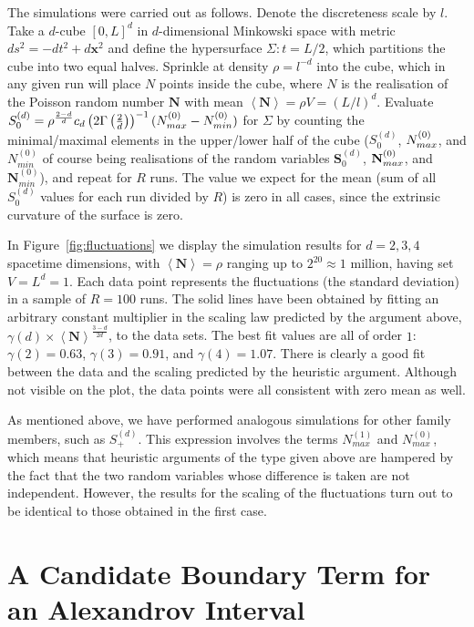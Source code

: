 \documentclass[12pt]{article}
\begin{document}
 
The simulations were carried out as follows. Denote the discreteness scale by $l$. Take a $d$-cube $[0,L]^d$ in $d$-dimensional Minkowski space with metric $ds^2=-dt^2+d{\mathbf x}^2$ and define the hypersurface $\Sigma: t=L/2$, which partitions the cube into two equal halves. Sprinkle at density $\rho=l^{-d}$ into the cube, which in any given run will place $N$ points inside the cube, where $N$ is the realisation of the Poisson random number $\textbf{N}$ with mean $\left\langle \textbf{N}\right\rangle = \rho V=  (L/l)^d$. Evaluate $S^{ (d)}_0=\rho^\frac{2-d}{d}c_d\left (2\Gamma\left (\frac{2}{d}\right)\right)^{-1} (N^{ (0)}_{\vphantom{i}max} - N_{min}^{ (0)})$ for $\Sigma$ by counting the minimal/maximal elements in the upper/lower half of the cube ($S^{ (d)}_0$, $N^{ (0)}_{\vphantom{i}max}$, and $N^{ (0)}_{min}$ of course being realisations of the random variables $\textbf{S}^{ (d)}_0$, $\textbf{N}^{ (0)}_{\vphantom{i}max}$, and $\textbf{N}^{ (0)}_{min}$), and repeat for $R$ runs. The value we expect for the mean (sum of all $S^{ (d)}_0$ values for each run divided by $R$) is zero in all cases, since the extrinsic curvature of the surface is zero.

In Figure~\ref{fig:fluctuations} we display the simulation results for $d=2,3,4$ spacetime dimensions, with $\left\langle\textbf{N}\right\rangle=\rho$ ranging up to $2^{20}\approx 1$ million, having set $V=L^d=1$. Each data point represents the fluctuations (the standard deviation) in a sample of $R=100$ runs. The solid lines have been obtained by fitting an arbitrary constant multiplier in the scaling law predicted by the argument above, $\gamma (d)\times \left\langle\textbf{N}\right\rangle^\frac{3-d}{2d}$, to the data sets. The best fit values are all of order $1$: $\gamma (2)=0.63$, $\gamma (3)=0.91$, and $\gamma (4)=1.07$.
There is clearly a good fit between the data and the scaling predicted by the heuristic argument. Although not visible on the plot, the data points were all consistent with zero mean as well.

As mentioned above, we have performed analogous simulations for other family members, such as $S^{ (d)}_+$. This expression involves the terms $N^{ (1)}_{max}$ and $N^{ (0)}_{max}$, which means that heuristic arguments of the type given above are hampered by the fact that the two random variables whose difference is taken are not independent. However, the results for the scaling of the fluctuations turn out to be identical to those obtained in the first case.

\section{A Candidate Boundary Term for an Alexandrov Interval}
\newcommand{\vol}{\mathrm{vol}}
\end{document}

